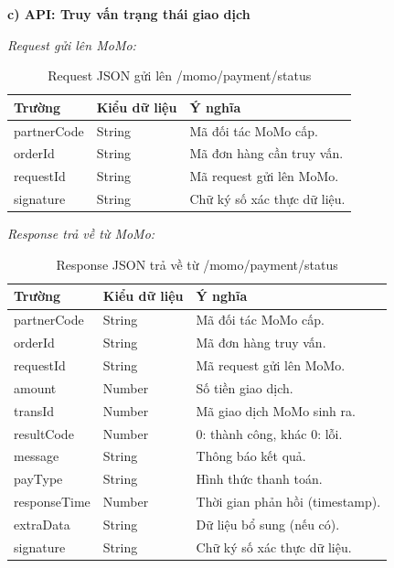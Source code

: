\textbf{c) API: Truy vấn trạng thái giao dịch}

\textit{Request gửi lên MoMo:}
\begin{table}[H]
    \centering
    \caption{Request JSON gửi lên /momo/payment/status}
    \begin{tabular}{|p{4cm}|p{2.5cm}|p{7cm}|}
        \hline
        \textbf{Trường} & \textbf{Kiểu dữ liệu} & \textbf{Ý nghĩa} \\
        \hline
        partnerCode & String & Mã đối tác MoMo cấp. \\
        \hline
        orderId & String & Mã đơn hàng cần truy vấn. \\
        \hline
        requestId & String & Mã request gửi lên MoMo. \\
        \hline
        signature & String & Chữ ký số xác thực dữ liệu. \\
        \hline
    \end{tabular}
\end{table}

\textit{Response trả về từ MoMo:}
\begin{table}[H]
    \centering
    \caption{Response JSON trả về từ /momo/payment/status}
    \begin{tabular}{|p{4cm}|p{2.5cm}|p{7cm}|}
        \hline
        \textbf{Trường} & \textbf{Kiểu dữ liệu} & \textbf{Ý nghĩa} \\
        \hline
        partnerCode & String & Mã đối tác MoMo cấp. \\
        \hline
        orderId & String & Mã đơn hàng truy vấn. \\
        \hline
        requestId & String & Mã request gửi lên MoMo. \\
        \hline
        amount & Number & Số tiền giao dịch. \\
        \hline
        transId & Number & Mã giao dịch MoMo sinh ra. \\
        \hline
        resultCode & Number & 0: thành công, khác 0: lỗi. \\
        \hline
        message & String & Thông báo kết quả. \\
        \hline
        payType & String & Hình thức thanh toán. \\
        \hline
        responseTime & Number & Thời gian phản hồi (timestamp). \\
        \hline
        extraData & String & Dữ liệu bổ sung (nếu có). \\
        \hline
        signature & String & Chữ ký số xác thực dữ liệu. \\
        \hline
    \end{tabular}
\end{table}

